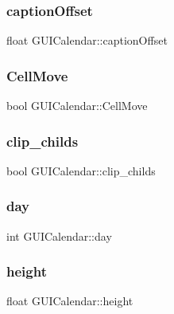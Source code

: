 \subsubsection{\texorpdfstring{caption\+Offset}{captionOffset}}
{\footnotesize\ttfamily float G\+U\+I\+Calendar\+::caption\+Offset}

\hypertarget{class_g_u_i_calendar_ab4c2b4b2b9669d835840598d8d9369b3}{}\label{class_g_u_i_calendar_ab4c2b4b2b9669d835840598d8d9369b3} 
\subsubsection{\texorpdfstring{Cell\+Move}{CellMove}}
{\footnotesize\ttfamily bool G\+U\+I\+Calendar\+::\+Cell\+Move}

\hypertarget{class_g_u_i_calendar_abbcd59c868f52b7439bb3760643da4c0}{}\label{class_g_u_i_calendar_abbcd59c868f52b7439bb3760643da4c0} 
\subsubsection{\texorpdfstring{clip\+\_\+childs}{clip\_childs}}
{\footnotesize\ttfamily bool G\+U\+I\+Calendar\+::clip\+\_\+childs}

\hypertarget{class_g_u_i_calendar_a1ed661850524a4400fcfd7c1492343e7}{}\label{class_g_u_i_calendar_a1ed661850524a4400fcfd7c1492343e7} 
\subsubsection{\texorpdfstring{day}{day}}
{\footnotesize\ttfamily int G\+U\+I\+Calendar\+::day}

\hypertarget{class_g_u_i_calendar_ae5d06969761b1183062eac9953fd6d5f}{}\label{class_g_u_i_calendar_ae5d06969761b1183062eac9953fd6d5f} 
\subsubsection{\texorpdfstring{height}{height}}
{\footnotesize\ttfamily float G\+U\+I\+Calendar\+::height}

